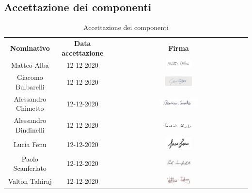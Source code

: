 \subsection{Accettazione dei componenti}
	\begin{table} [h!]
		\begin{center}
			\renewcommand{\arraystretch}{3}
			\begin{tabular} { c c c }
				\rowcolor{lightgray}
				\textbf{Nominativo} & \textbf{Data accettazione} & \textbf{Firma} \\
				Matteo Alba & 12-12-2020 & \includegraphics[width=0.2\textwidth]{res/img/firme/matteo_alba.jpg}\\
				Giacomo Bulbarelli & 12-12-2020 & \includegraphics[width=0.2\textwidth]{res/img/firme/giacomo_bulbarelli.jpg}\\
				Alessandro Chimetto & 12-12-2020 & \includegraphics[width=0.3\textwidth]{res/img/firme/alessandro_chimetto.jpg}\\
				Alessandro Dindinelli & 12-12-2020 & \includegraphics[width=0.2\textwidth]{res/img/firme/alessandro_dindinelli.jpg}\\
				Lucia Fenu & 12-12-2020 & \includegraphics[width=0.2\textwidth]{res/img/firme/lucia_fenu.jpg}\\
				Paolo Scanferlato & 12-12-2020 & \includegraphics[width=0.2\textwidth]{res/img/firme/paolo_scanferlato.jpg}\\
				Valton Tahiraj & 12-12-2020 & \includegraphics[width=0.2\textwidth]{res/img/firme/valton_tahiraj.jpg}\\
			\end{tabular}
			\caption{Accettazione dei componenti}
		\end{center}
	\end{table}

